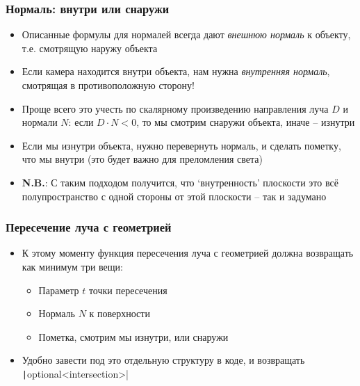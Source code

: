 \documentclass[10pt]{beamer}
\begin{document}
\begin{frame}[fragile]
\frametitle{Нормаль: внутри или снаружи}
\begin{itemize}
\item Описанные формулы для нормалей всегда дают \textit{внешнюю нормаль} к объекту, т.е. смотрящую наружу объекта
\pause
\item Если камера находится внутри объекта, нам нужна \textit{внутренняя нормаль}, смотрящая в противоположную сторону!
\pause
\item Проще всего это учесть по скалярному произведению направления луча \begin{math}D\end{math} и нормали \begin{math}N\end{math}: если \begin{math}D\cdot N < 0\end{math}, то мы смотрим снаружи объекта, иначе -- изнутри
\pause
\item Если мы изнутри объекта, нужно перевернуть нормаль, и сделать пометку, что мы внутри (это будет важно для преломления света)
\pause
\item \alert{\textbf{N.B.}}: С таким подходом получится, что `внутренность' плоскости это всё полупространство с одной стороны от этой плоскости -- так и задумано
\end{itemize}
\end{frame}

\begin{frame}[fragile]
\frametitle{Пересечение луча с геометрией}
\begin{itemize}
\item К этому моменту функция пересечения луча с геометрией должна возвращать как минимум три вещи:
\pause
\begin{itemize}
\item Параметр \begin{math}t\end{math} точки пересечения
\pause
\item Нормаль \begin{math}N\end{math} к поверхности
\pause
\item Пометка, смотрим мы изнутри, или снаружи
\end{itemize}
\pause
\item Удобно завести под это отдельную структуру в коде, и возвращать \texttt|optional<intersection>|
\end{itemize}
\end{frame}
\end{document}
